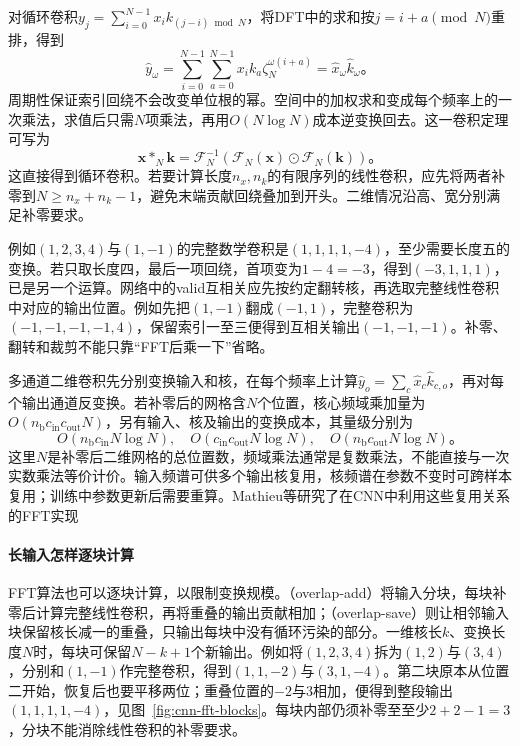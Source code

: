 对循环卷积$y_j=\sum_{i=0}^{N-1}x_i k_{(j-i)\bmod N}$，将DFT中的求和按$j=i+a\pmod N$重排，得到
\begin{equation}
  \widehat y_\omega
    =\sum_{i=0}^{N-1}\sum_{a=0}^{N-1}
        x_i k_a\zeta_N^{\omega(i+a)}
    =\widehat x_\omega\widehat k_\omega\text{。}
  \label{eq:cnn-convolution-theorem-derivation}
\end{equation}
周期性保证索引回绕不会改变单位根的幂。空间中的加权求和变成每个频率上的一次乘法，求值后只需$N$项乘法，再用$O(N\log N)$成本逆变换回去。这一卷积定理可写为
\begin{equation}
  \bm x*_N\bm k=\mathcal F_N^{-1}
       \!\left(\mathcal F_N(\bm x)\odot\mathcal F_N(\bm k)\right)\text{。}
  \label{eq:cnn-fft-convolution}
\end{equation}
这直接得到循环卷积。若要计算长度$n_x,n_k$的有限序列的线性卷积，应先将两者补零到$N\geq n_x+n_k-1$，避免末端贡献回绕叠加到开头。二维情况沿高、宽分别满足补零要求。

例如$(1,2,3,4)$与$(1,-1)$的完整数学卷积是$(1,1,1,1,-4)$，至少需要长度五的变换。若只取长度四，最后一项回绕，首项变为$1-4=-3$，得到$(-3,1,1,1)$，已是另一个运算。网络中的valid互相关应先按约定翻转核，再选取完整线性卷积中对应的输出位置。例如先把$(1,-1)$翻成$(-1,1)$，完整卷积为$(-1,-1,-1,-1,4)$，保留索引一至三便得到互相关输出$(-1,-1,-1)$。补零、翻转和裁剪不能只靠“FFT后乘一下”省略。

多通道二维卷积先分别变换输入和核，在每个频率上计算$\widehat y_o=\sum_c\widehat x_c\widehat k_{c,o}$，再对每个输出通道反变换。若补零后的网格含$N$个位置，核心频域乘加量为$O(n_{\mathrm b}c_{\mathrm{in}}c_{\mathrm{out}}N)$，另有输入、核及输出的变换成本，其量级分别为
\[
  O(n_{\mathrm b}c_{\mathrm{in}}N\log N),\quad
  O(c_{\mathrm{in}}c_{\mathrm{out}}N\log N),\quad
  O(n_{\mathrm b}c_{\mathrm{out}}N\log N)\text{。}
\]
这里$N$是补零后二维网格的总位置数，频域乘法通常是复数乘法，不能直接与一次实数乘法等价计价。输入频谱可供多个输出核复用，核频谱在参数不变时可跨样本复用；训练中参数更新后需要重算。Mathieu等研究了在CNN中利用这些复用关系的FFT实现

\paragraph{长输入怎样逐块计算}

FFT算法也可以逐块计算，以限制变换规模。（overlap-add）将输入分块，每块补零后计算完整线性卷积，再将重叠的输出贡献相加；（overlap-save）则让相邻输入块保留核长减一的重叠，只输出每块中没有循环污染的部分。一维核长$k$、变换长度$N$时，每块可保留$N-k+1$个新输出。例如将$(1,2,3,4)$拆为$(1,2)$与$(3,4)$，分别和$(1,-1)$作完整卷积，得到$(1,1,-2)$与$(3,1,-4)$。第二块原本从位置二开始，恢复后也要平移两位；重叠位置的$-2$与$3$相加，便得到整段输出$(1,1,1,1,-4)$，见图~\ref{fig:cnn-fft-blocks}。每块内部仍须补零至至少$2+2-1=3$，分块不能消除线性卷积的补零要求。

